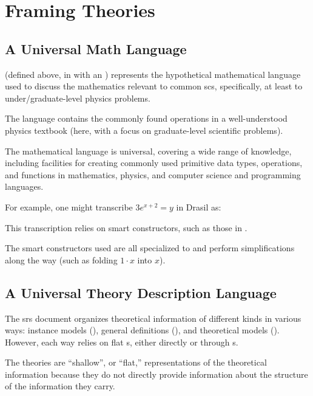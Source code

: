 \chapter{Framing Theories}
\label{chap:modelkinds}


\section{A Universal Math Language}
\label{sec:modelkinds:language}

\originalExprHaskell

\Expr{} (defined above, in  with an )
represents the hypothetical mathematical language used to discuss the
mathematics relevant to common \acs{scs}, specifically, at least to
under/graduate-level physics problems.

The language contains the commonly found operations in a well-understood physics
textbook (here, with a focus on graduate-level scientific problems).

The mathematical language is universal, covering a wide range of knowledge,
including facilities for creating commonly used primitive data types,
operations, and functions  in mathematics, physics, and computer science and
programming languages.

For example, one might transcribe \(3 e^{x + 2} = y\) in Drasil as:

\pseudoExampleExpression{}

This transcription relies on smart constructors, such as those in
.

The smart constructors used are all specialized to \Expr{} and perform
simplifications along the way (such as folding \(1 \cdot x\) into \(x\)).






\section{A Universal Theory Description Language}

The \acs{srs} document organizes theoretical information of different kinds in
various ways: instance models (\InstanceModel{}), general definitions
(\GenDefn{}), and theoretical models (\TheoryModel{}). However, each way relies
on flat \Relation{}s, either directly or through \RelationConcept{}s.

The theories are ``shallow'', or ``flat,'' representations of the theoretical
information because they do not directly provide information about the structure
of the information they carry.

